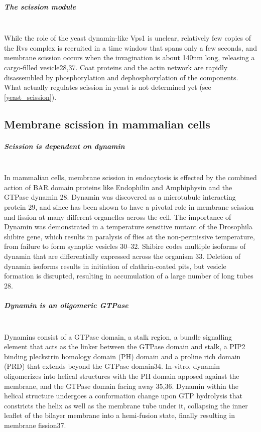 		\subparagraph{The scission module}
		\mbox{} \\
		While the role of the yeast dynamin-like Vps1 is unclear, relatively few copies of the Rvs complex is recruited in a time window that spans only a few seconds, and membrane scission occurs when the invagination is about 140nm long, releasing a cargo-filled vesicle28,37. Coat proteins and the actin network are rapidly disassembled by phosphorylation and dephosphorylation of the components. What actually regulates scission in yeast is not determined yet (see \ref{yeast_scission}).

		
\subsection{Membrane scission in mammalian cells}
		\subparagraph{Scission is dependent on dynamin} 
		\mbox{} \\
		In mammalian cells, membrane scission in endocytosis is effected by the combined action of BAR domain proteins like Endophilin and Amphiphysin and the GTPase dynamin 28.  Dynamin was discovered as a microtubule interacting protein 29, and since has been shown to have a pivotal role in membrane scission and fission at many different organelles across the cell. The importance of Dynamin was demonstrated in a temperature sensitive mutant of the Drosophila shibire gene, which results in paralysis of flies at the non-permissive temperature, from failure to form synaptic vesicles 30–32. Shibire codes multiple isoforms of dynamin that are differentially expressed across the organism 33. Deletion of dynamin isoforms results in initiation of clathrin-coated pits, but vesicle formation is disrupted, resulting in accumulation of a large number of long tubes 28. 

		 
		\subparagraph{Dynamin is an oligomeric GTPase}
		\mbox{} \\ 
		Dynamins consist of a GTPase domain, a stalk region, a bundle signalling element that acts as the linker between the GTPase domain and stalk, a PIP2 binding pleckstrin homology domain (PH) domain and a proline rich domain (PRD) that extends beyond the GTPase domain34. In-vitro, dynamin oligomerizes into helical structures with the PH domain apposed against the membrane, and the GTPase domain facing away 35,36. Dynamin within the helical structure undergoes a conformation change upon GTP hydrolysis that constricts the helix as well as the membrane tube under it, collapsing the inner leaflet of the bilayer membrane into a hemi-fusion state, finally resulting in membrane fission37.

